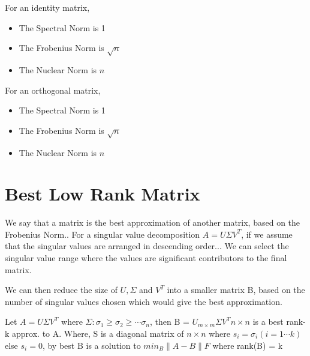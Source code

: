 \documentclass[twoside]{report}
\begin{document}
For an identity matrix, 
\begin{itemize}
	\item The Spectral Norm is 1
	\item The Frobenius Norm is $\sqrt{n}$
	\item The Nuclear Norm is ${n}$
\end{itemize}
For an orthogonal matrix, 
\begin{itemize}
	\item The Spectral Norm is 1
	\item The Frobenius Norm is $\sqrt{n}$
	\item The Nuclear Norm is ${n}$
\end{itemize}
\section{Best Low Rank Matrix}
We say that a matrix is the best approximation of another matrix, based on the Frobenius Norm..
For a singular value decomposition $A = U\Sigma V^T$, if we assume that the singular values are arranged in descending order... We can select the singular value range where the values are significant contributors to the final matrix.

We can then reduce the size of $U, \Sigma$ and $V^T$ into a smaller matrix B, based on the number of singular values chosen which would give the best approximation.
\begin{theorem}
	Let $A = U\Sigma V^T$ where $\Sigma: \sigma_1 \geq \sigma_2 \geq \cdots \sigma_n$, then B = $U_{m\times m} \Sigma V^T{n \times n}$ is a best rank-k approx. to A.
	Where, S is a diagonal matrix of $n \times n$ where $s_i = \sigma_i (i = 1\cdots k)$ else $s_i = 0$, by best B is a solution to $min_B \|A - B\|F$ where rank(B) = k
\end{theorem}
\end{document}
